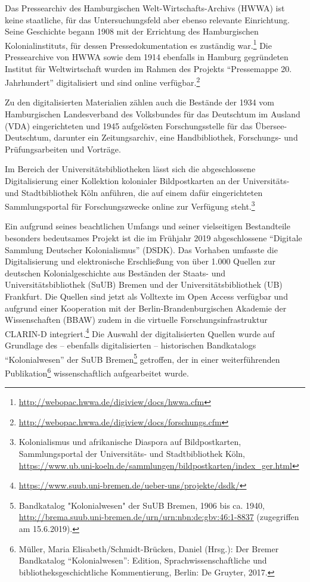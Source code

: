 \documentclass[a4paper,
fontsize=11pt,
oneside,
numbers=noperiodatend,
parskip=half-,
bibliography=totoc,
final
]{scrartcl}
\begin{document}
Das Pressearchiv des Hamburgischen Welt-Wirtschafts-Archivs (HWWA) ist
keine staatliche, für das Untersuchungsfeld aber ebenso relevante
Einrichtung. Seine Geschichte begann 1908 mit der Errichtung des
Hamburgischen Kolonialinstituts, für dessen Pressedokumentation es
zuständig war.\footnote{\url{http://webopac.hwwa.de/digiview/docs/hwwa.cfm}}
Die Pressearchive von HWWA sowie dem 1914 ebenfalls in Hamburg
gegründeten Institut für Weltwirtschaft wurden im Rahmen des Projekts
\enquote{Pressemappe 20. Jahrhundert} digitalisiert und sind online
verfügbar.\footnote{\url{http://webopac.hwwa.de/digiview/docs/forschungs.cfm}}

Zu den digitalisierten Materialien zählen auch die Bestände der 1934 vom
Hamburgischen Landesverband des Volksbundes für das Deutschtum im
Ausland (VDA) eingerichteten und 1945 aufgelösten Forschungsstelle für
das Übersee-Deutschtum, darunter ein Zeitungsarchiv, eine
Handbibliothek, Forschungs- und Prüfungsarbeiten und Vorträge.

Im Bereich der Universitätsbibliotheken lässt sich die abgeschlossene
Digitalisierung einer Kollektion kolonialer Bildpostkarten an der
Universitäts- und Stadtbibliothek Köln anführen, die auf einem dafür
eingerichteten Sammlungsportal für Forschungszwecke online zur Verfügung
steht.\footnote{Kolonialismus und afrikanische Diaspora auf
  Bildpostkarten, Sammlungsportal der Universitäts- und Stadtbibliothek
  Köln,
  \url{https://www.ub.uni-koeln.de/sammlungen/bildpostkarten/index_ger.html}}

Ein aufgrund seines beachtlichen Umfangs und seiner vielseitigen
Bestandteile besonders bedeutsames Projekt ist die im Frühjahr 2019
abgeschlossene \enquote{Digitale Sammlung Deutscher Kolonialismus}
(DSDK). Das Vorhaben umfasste die Digitalisierung und elektronische
Erschließung von über 1.000 Quellen zur deutschen Kolonialgeschichte aus
Beständen der Staats- und Universitätsbibliothek (SuUB) Bremen und der
Universitätsbibliothek (UB) Frankfurt. Die Quellen sind jetzt als
Volltexte im Open Access verfügbar und aufgrund einer Kooperation mit
der Berlin-Brandenburgischen Akademie der Wissenschaften (BBAW) zudem in
die virtuelle Forschungsinfrastruktur CLARIN-D integriert.\footnote{\url{https://www.suub.uni-bremen.de/ueber-uns/projekte/dsdk/}}
Die Auswahl der digitalisierten Quellen wurde auf Grundlage des --
ebenfalls digitalisierten -- historischen Bandkatalogs
\enquote{Kolonialwesen} der SuUB Bremen\footnote{Bandkatalog
  "Kolonialwesen" der SuUB Bremen, 1906 bis ca. 1940,
  \url{http://brema.suub.uni-bremen.de/urn/urn:nbn:de:gbv:46:1-8837}
  (zugegriffen am 15.6.2019).} getroffen, der in einer weiterführenden
Publikation\footnote{Müller, Maria Elisabeth/Schmidt-Brücken, Daniel
  (Hrsg.): Der Bremer Bandkatalog \enquote{Kolonialwesen}: Edition,
  Sprachwissenschaftliche und bibliotheksgeschichtliche Kommentierung,
  Berlin: De Gruyter, 2017.} wissenschaftlich aufgearbeitet wurde.
\end{document}
